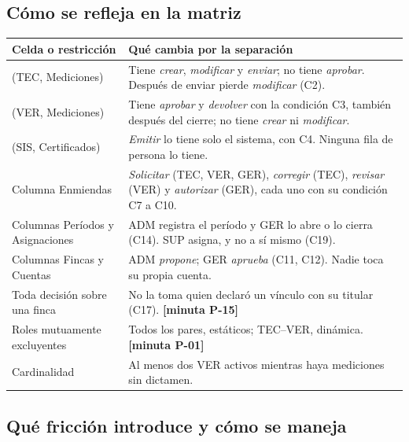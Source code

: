 \documentclass[11pt,letterpaper]{article}
\newcommand{\cab}[1]{\textbf{\rmfamily #1}}
\newcommand{\resp}[1]{\textrm{\footnotesize\bfseries [minuta #1]}}
\begin{document}
\subsection{Cómo se refleja en la matriz}

\begin{center}
\small
\renewcommand{\arraystretch}{1.22}
\begin{tabularx}{\textwidth}{@{}L{4.3cm} Y@{}}
\toprule
\cab{Celda o restricción} & \cab{Qué cambia por la separación} \\
\midrule
(TEC, Mediciones) & Tiene \emph{crear}, \emph{modificar} y \emph{enviar}; no tiene \emph{aprobar}. Después de enviar pierde \emph{modificar} (C2). \\
(VER, Mediciones) & Tiene \emph{aprobar} y \emph{devolver} con la condición C3, también después del cierre; no tiene \emph{crear} ni \emph{modificar}. \\
(SIS, Certificados) & \emph{Emitir} lo tiene solo el sistema, con C4. Ninguna fila de persona lo tiene. \\
Columna Enmiendas & \emph{Solicitar} (TEC, VER, GER), \emph{corregir} (TEC), \emph{revisar} (VER) y \emph{autorizar} (GER), cada uno con su condición C7 a C10. \\
Columnas Períodos y Asignaciones & ADM registra el período y GER lo abre o lo cierra (C14). SUP asigna, y no a sí mismo (C19). \\
Columnas Fincas y Cuentas & ADM \emph{propone}; GER \emph{aprueba} (C11, C12). Nadie toca su propia cuenta. \\
Toda decisión sobre una finca & No la toma quien declaró un vínculo con su titular (C17). \resp{P-15} \\
Roles mutuamente excluyentes & Todos los pares, estáticos; TEC--VER, dinámica. \resp{P-01} \\
Cardinalidad & Al menos dos VER activos mientras haya mediciones sin dictamen. \\
\bottomrule
\end{tabularx}
\end{center}

\subsection{Qué fricción introduce y cómo se maneja}
\label{sec:friccion}
\end{document}
